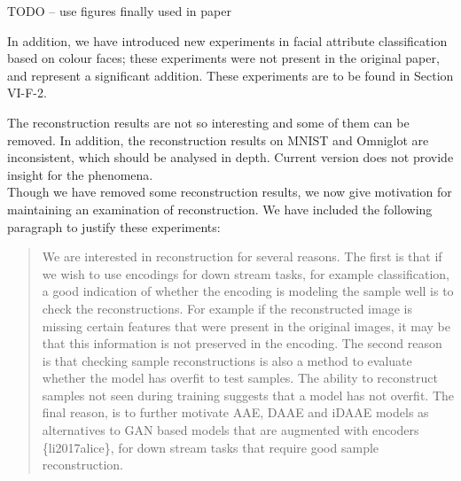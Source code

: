 \documentclass{article}
\begin{document}
{\color{red} TODO -- use figures finally used in paper}

\begin{figure}

\end{figure}


In addition, we have introduced new experiments in facial attribute classification based on colour faces; these experiments were not present in the original paper, and represent a significant addition.  These experiments are to be found in {\color{red} Section VI-F-2}.

{\color{blue}
The reconstruction results are not so interesting and some of them can be removed. In addition, the reconstruction results on MNIST and Omniglot are inconsistent, which should be analysed in depth. Current version does not provide insight for the phenomena.}\\


Though we have removed some reconstruction results, we now give motivation for maintaining an examination of reconstruction. We have included the following paragraph to justify these experiments:

\begin{quote}
We are interested in reconstruction for several reasons. The first is that if we wish to use encodings for down stream tasks, for example classification, a good indication of whether the encoding is modeling the sample well is to check the reconstructions. For example if the reconstructed image is missing certain features that were present in the original images, it may be that this information is not preserved in the encoding. The second reason is that checking sample reconstructions is also a method to evaluate whether the model has overfit to test samples. The ability to reconstruct samples not seen during training suggests that a model has not overfit. The final reason, is to further motivate AAE, DAAE and iDAAE models as alternatives to GAN based models that are augmented with encoders \{li2017alice\}, for down stream tasks that require good sample reconstruction.
\end{quote}
\end{document}
